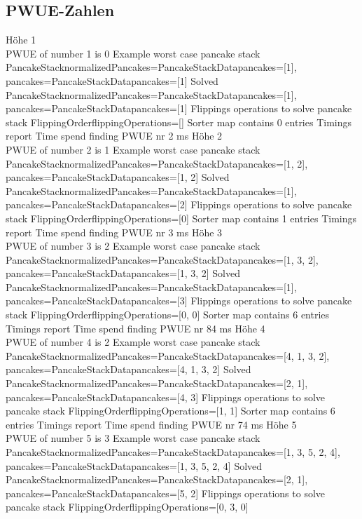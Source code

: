 \subsection{PWUE-Zahlen}\label{subsec:pwue-zahlen}
Höhe 1 \\
PWUE of number 1 is 0
Example worst case pancake stack PancakeStack{normalizedPancakes=PancakeStackData{pancakes=[1]}, pancakes=PancakeStackData{pancakes=[1]}}
Solved PancakeStack{normalizedPancakes=PancakeStackData{pancakes=[1]}, pancakes=PancakeStackData{pancakes=[1]}}
Flippings operations to solve pancake stack FlippingOrder{flippingOperations=[]}
Sorter map contains 0 entries
Timings report
Time spend finding PWUE nr 2 ms
Höhe 2 \\
PWUE of number 2 is 1
Example worst case pancake stack PancakeStack{normalizedPancakes=PancakeStackData{pancakes=[1, 2]}, pancakes=PancakeStackData{pancakes=[1, 2]}}
Solved PancakeStack{normalizedPancakes=PancakeStackData{pancakes=[1]}, pancakes=PancakeStackData{pancakes=[2]}}
Flippings operations to solve pancake stack FlippingOrder{flippingOperations=[0]}
Sorter map contains 1 entries
Timings report
Time spend finding PWUE nr 3 ms
Höhe 3 \\
PWUE of number 3 is 2
Example worst case pancake stack PancakeStack{normalizedPancakes=PancakeStackData{pancakes=[1, 3, 2]}, pancakes=PancakeStackData{pancakes=[1, 3, 2]}}
Solved PancakeStack{normalizedPancakes=PancakeStackData{pancakes=[1]}, pancakes=PancakeStackData{pancakes=[3]}}
Flippings operations to solve pancake stack FlippingOrder{flippingOperations=[0, 0]}
Sorter map contains 6 entries
Timings report
Time spend finding PWUE nr 84 ms
Höhe 4 \\
PWUE of number 4 is 2
Example worst case pancake stack PancakeStack{normalizedPancakes=PancakeStackData{pancakes=[4, 1, 3, 2]}, pancakes=PancakeStackData{pancakes=[4, 1, 3, 2]}}
Solved PancakeStack{normalizedPancakes=PancakeStackData{pancakes=[2, 1]}, pancakes=PancakeStackData{pancakes=[4, 3]}}
Flippings operations to solve pancake stack FlippingOrder{flippingOperations=[1, 1]}
Sorter map contains 6 entries
Timings report
Time spend finding PWUE nr 74 ms
Höhe 5 \\
PWUE of number 5 is 3
Example worst case pancake stack PancakeStack{normalizedPancakes=PancakeStackData{pancakes=[1, 3, 5, 2, 4]}, pancakes=PancakeStackData{pancakes=[1, 3, 5, 2, 4]}}
Solved PancakeStack{normalizedPancakes=PancakeStackData{pancakes=[2, 1]}, pancakes=PancakeStackData{pancakes=[5, 2]}}
Flippings operations to solve pancake stack FlippingOrder{flippingOperations=[0, 3, 0]}
